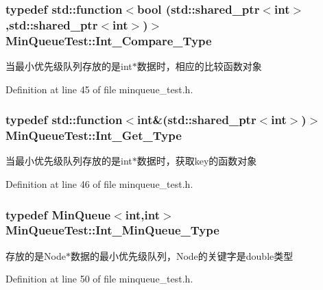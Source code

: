 \subsubsection[{Int\+\_\+\+Compare\+\_\+\+Type}]{\setlength{\rightskip}{0pt plus 5cm}typedef std\+::function$<$bool (std\+::shared\+\_\+ptr$<$int$>$,std\+::shared\+\_\+ptr$<$int$>$)$>$ {\bf Min\+Queue\+Test\+::\+Int\+\_\+\+Compare\+\_\+\+Type}}\label{class_min_queue_test_a627ceae9e25205d70955137bbfc863fd}
当最小优先级队列存放的是int$\ast$数据时，相应的比较函数对象 

Definition at line 45 of file minqueue\+\_\+test.\+h.

\hypertarget{class_min_queue_test_a40648c6c5c338387bda62519dc99fc79}{}
\subsubsection[{Int\+\_\+\+Get\+\_\+\+Type}]{\setlength{\rightskip}{0pt plus 5cm}typedef std\+::function$<$int\&(std\+::shared\+\_\+ptr$<$int$>$)$>$ {\bf Min\+Queue\+Test\+::\+Int\+\_\+\+Get\+\_\+\+Type}}\label{class_min_queue_test_a40648c6c5c338387bda62519dc99fc79}
当最小优先级队列存放的是int$\ast$数据时，获取key的函数对象 

Definition at line 46 of file minqueue\+\_\+test.\+h.

\hypertarget{class_min_queue_test_ad81df38acc845934accb320c4dbdd582}{}
\subsubsection[{Int\+\_\+\+Min\+Queue\+\_\+\+Type}]{\setlength{\rightskip}{0pt plus 5cm}typedef {\bf Min\+Queue}$<$int,int$>$ {\bf Min\+Queue\+Test\+::\+Int\+\_\+\+Min\+Queue\+\_\+\+Type}}\label{class_min_queue_test_ad81df38acc845934accb320c4dbdd582}
存放的是\+Node$\ast$数据的最小优先级队列，\+Node的关键字是double类型 

Definition at line 50 of file minqueue\+\_\+test.\+h.

\hypertarget{class_min_queue_test_a25bfd5b74968c587db57133f107a5f61}{}
